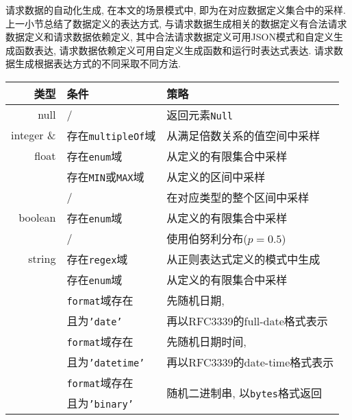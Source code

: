         请求数据的自动化生成, 在本文的场景模式中, 即为在对应数据定义集合中的采样. 上一小节总结了数据定义的表达方式, 与请求数据生成相关的数据定义有合法请求数据定义和请求数据依赖定义, 其中合法请求数据定义可用JSON模式和自定义生成函数表达, 请求数据依赖定义可用自定义生成函数和运行时表达式表达. 请求数据生成根据表达方式的不同采取不同方法.
        
        \begin{table}[!htb]
            \centering
            \begin{tabular}{rll}
                \toprule
                类型 & 条件 & 策略 \\
                \midrule
                null & / & 返回元素\texttt{Null} \\
                \hline
                integer \& & 存在\texttt{multipleOf}域 & 从满足倍数关系的值空间中采样 \\
                \cline{2-3}
                float & 存在\texttt{enum}域 & 从定义的有限集合中采样 \\
                \cline{2-3}
                & 存在\texttt{MIN}或\texttt{MAX}域 & 从定义的区间中采样 \\
                \cline{2-3}
                & / & 在对应类型的整个区间中采样 \\
                \hline
                boolean & 存在\texttt{enum}域 & 从定义的有限集合中采样 \\
                \cline{2-3}
                & / & 使用伯努利分布($p=0.5$) \\
                \hline
                string & 存在\texttt{regex}域 & 从正则表达式定义的模式中生成 \\
                \cline{2-3} 
                & 存在\texttt{enum}域 & 从定义的有限集合中采样 \\
                \cline{2-3}
                & \texttt{format}域存在 & 先随机日期, \\
                & 且为\texttt{'date'} & 再以RFC3339的full-date格式表示 \\
                \cline{2-3}
                & \texttt{format}域存在 & 先随机日期时间, \\
                & 且为\texttt{'datetime'} & 再以RFC3339的date-time格式表示 \\
                \cline{2-3}
                & \texttt{format}域存在 & \multirow{2}{*}{随机二进制串, 以\texttt{bytes}格式返回} \\
                & 且为\texttt{'binary'} &  \\
                \cline{2-3}

\end{tabular}
\end{table}
